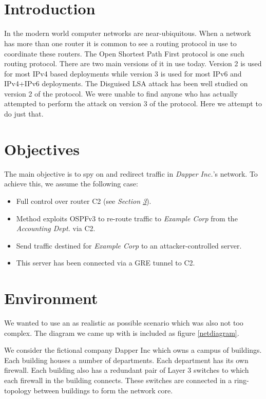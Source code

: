 \documentclass[11pt,a4paper,oneside]{article}
\title{\ftitle\\\coursecode { -} \coursename}
\author{\fauthor}
\newcommand{\lsection}[2]{\section{#1}\label{sec:#2}}
\begin{document}
    \maketitle\thispagestyle{fancy}
    \newpage
    \tableofcontents
    \newpage


    \lsection{Introduction}{intro}
    In the modern world computer networks are near-ubiquitous.
    When a network has more than one router it is common to see a routing protocol in use to coordinate these routers.
    The Open Shortest Path First protocol is one such routing protocol.
    There are two main versions of it in use today.
    Version 2 is used for most IPv4 based deployments while version 3 is used for most IPv6 and IPv4+IPv6 deployments.
    The Disguised LSA attack has been well studied on version 2 of the protocol.
    We were unable to find anyone who has actually attempted to perform the attack on version 3 of the protocol.
    Here we attempt to do just that.


    \lsection{Objectives}{objectives}
    The main objective is to spy on and redirect traffic in \textit{Dapper Inc.}'s network. To achieve this, we assume the following case:
    \begin{itemize}
        \item Full control over router C2 (see \textit{Section \ref{sec:env_setup}}).
        \item Method exploits OSPFv3 to re-route traffic to \textit{Example Corp} from the \textit{Accounting Dept.} via C2.
        \item Send traffic destined for \textit{Example Corp} to an attacker-controlled server.
        \item This server has been connected via a GRE tunnel to C2.
    \end{itemize}


    \lsection{Environment}{env_setup}
    		We wanted to use an as realistic as possible scenario which was also not too complex.
            The diagram we came up with is included as figure \ref{netdiagram}.
    		
    		We consider the fictional company Dapper Inc which owns a campus of buildings.
            Each building houses a number of departments.
            Each department has its own firewall.
            Each building also has a redundant pair of Layer 3 switches to which each firewall in the building connects.
            These switches are connected in a ring-topology between buildings to form the network core.
\end{document}
